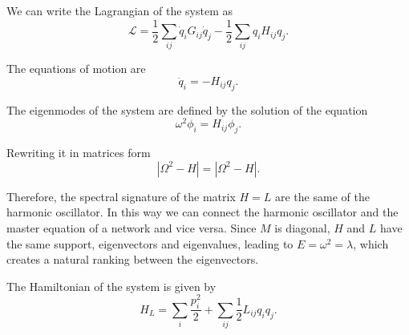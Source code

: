 We can write the Lagrangian of the system as
\begin{equation}
    \mathcal{L} = \frac{1}{2}\sum_{ij} \dot q_i G_{ij} \dot q_j - \frac{1}{2} \sum_{ij} q_iH_{ij}q_j.
\end{equation}

The equations of motion are
\begin{equation}
    \ddot q_i = -H_{ij} q_j.
\end{equation}

The eigenmodes of the system are defined by the solution of the equation 
\begin{equation}
    \omega^2 \phi_i = H_{ij} \phi_j.
\end{equation}

Rewriting it in matrices form
\begin{equation}
    |\Omega^2 - H| = |\Omega^2 - H|.
\end{equation}

Therefore, the spectral signature of the matrix $H = L$ are the same of the harmonic oscillator. In this way we can connect the harmonic oscillator and the master equation of a network and vice versa. Since $M$ is diagonal, $H$ and $L$ have the same support, eigenvectors and eigenvalues, leading to $E = \omega^2 = \lambda$, which creates a natural ranking between the eigenvectors. 

The Hamiltonian of the system is given by
\begin{equation}\label{H_L}
    H_L = \sum_i \frac{p_i^2}{2} + \sum_{ij} \frac{1}{2}L_{ij}q_iq_j.
\end{equation}



